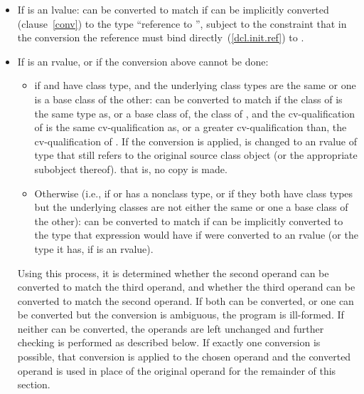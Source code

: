 \begin{itemize}
\item If  is an lvalue:  can be converted to match
 if  can be implicitly converted (clause~\ref{conv})
to the type ``reference to '', subject to the
constraint that in the conversion the reference must bind
directly~(\ref{dcl.init.ref}) to .

\item If  is an rvalue, or if the conversion above cannot be
done:

\begin{itemize}
\item if  and  have class type, and the underlying
class types are the same or one is a base class of the other: 
can be converted to match  if the class of  is the
same type as, or a base class of, the class of , and the
cv-qualification of  is the same cv-qualification as, or a
greater cv-qualification than, the cv-qualification of . If
the conversion is applied,  is changed to an rvalue of type
 that still refers to the original source class object (or the
appropriate subobject thereof).
\enternote that is, no copy is made. \exitnote

\item Otherwise (i.e., if  or  has a nonclass type,
or if they both have class types but the underlying classes are not
either the same or one a base class of the other):  can be
converted to match  if  can be implicitly converted
to the type that expression  would have if  were
converted to an rvalue (or the type it has, if  is an rvalue).
\end{itemize}

Using this process, it is determined whether the second operand can be
converted to match the third operand, and whether the third operand can
be converted to match the second operand. If both can be converted, or
one can be converted but the conversion is ambiguous, the program is
ill-formed. If neither can be converted, the operands are left unchanged
and further checking is performed as described below. If exactly one
conversion is possible, that conversion is applied to the chosen operand
and the converted operand is used in place of the original operand for
the remainder of this section.
\end{itemize}

